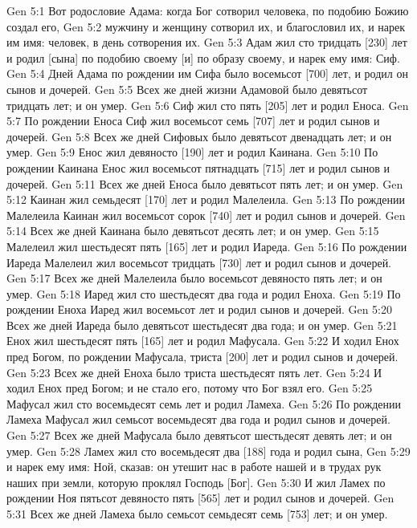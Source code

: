 \vs Gen 5:1 Вот родословие Адама: когда Бог сотворил человека, по подобию Божию создал его,
\vs Gen 5:2 мужчину и женщину сотворил их, и благословил их, и нарек им имя: человек, в день сотворения их.
\vs Gen 5:3 Адам жил сто тридцать [230] лет и родил [сына] по подобию своему [и] по образу своему, и нарек ему имя: Сиф.
\vs Gen 5:4 Дней Адама по рождении им Сифа было восемьсот [700] лет, и родил он сынов и дочерей.
\vs Gen 5:5 Всех же дней жизни Адамовой было девятьсот тридцать лет; и он умер.
\rsbpar\vs Gen 5:6 Сиф жил сто пять [205] лет и родил Еноса.
\vs Gen 5:7 По рождении Еноса Сиф жил восемьсот семь [707] лет и родил сынов и дочерей.
\vs Gen 5:8 Всех же дней Сифовых было девятьсот двенадцать лет; и он умер.
\rsbpar\vs Gen 5:9 Енос жил девяносто [190] лет и родил Каинана.
\vs Gen 5:10 По рождении Каинана Енос жил восемьсот пятнадцать [715] лет и родил сынов и дочерей.
\vs Gen 5:11 Всех же дней Еноса было девятьсот пять лет; и он умер.
\rsbpar\vs Gen 5:12 Каинан жил семьдесят [170] лет и родил Малелеила.
\vs Gen 5:13 По рождении Малелеила Каинан жил восемьсот сорок [740] лет и родил сынов и дочерей.
\vs Gen 5:14 Всех же дней Каинана было девятьсот десять лет; и он умер.
\rsbpar\vs Gen 5:15 Малелеил жил шестьдесят пять [165] лет и родил Иареда.
\vs Gen 5:16 По рождении Иареда Малелеил жил восемьсот тридцать [730] лет и родил сынов и дочерей.
\vs Gen 5:17 Всех же дней Малелеила было восемьсот девяносто пять лет; и он умер.
\rsbpar\vs Gen 5:18 Иаред жил сто шестьдесят два года и родил Еноха.
\vs Gen 5:19 По рождении Еноха Иаред жил восемьсот лет и родил сынов и дочерей.
\vs Gen 5:20 Всех же дней Иареда было девятьсот шестьдесят два года; и он умер.
\rsbpar\vs Gen 5:21 Енох жил шестьдесят пять [165] лет и родил Мафусала.
\vs Gen 5:22 И ходил Енох пред Богом, по рождении Мафусала, триста [200] лет и родил сынов и дочерей.
\vs Gen 5:23 Всех же дней Еноха было триста шестьдесят пять лет.
\vs Gen 5:24 И ходил Енох пред Богом; и не стало его, потому что Бог взял его.
\rsbpar\vs Gen 5:25 Мафусал жил сто восемьдесят семь лет и родил Ламеха.
\vs Gen 5:26 По рождении Ламеха Мафусал жил семьсот восемьдесят два года и родил сынов и дочерей.
\vs Gen 5:27 Всех же дней Мафусала было девятьсот шестьдесят девять лет; и он умер.
\rsbpar\vs Gen 5:28 Ламех жил сто восемьдесят два [188] года и родил сына,
\vs Gen 5:29 и нарек ему имя: Ной, сказав: он утешит нас в работе нашей и в трудах рук наших при  земли, которую проклял Господь [Бог].
\vs Gen 5:30 И жил Ламех по рождении Ноя пятьсот девяносто пять [565] лет и родил сынов и дочерей.
\vs Gen 5:31 Всех же дней Ламеха было семьсот семьдесят семь [753] лет; и он умер.
